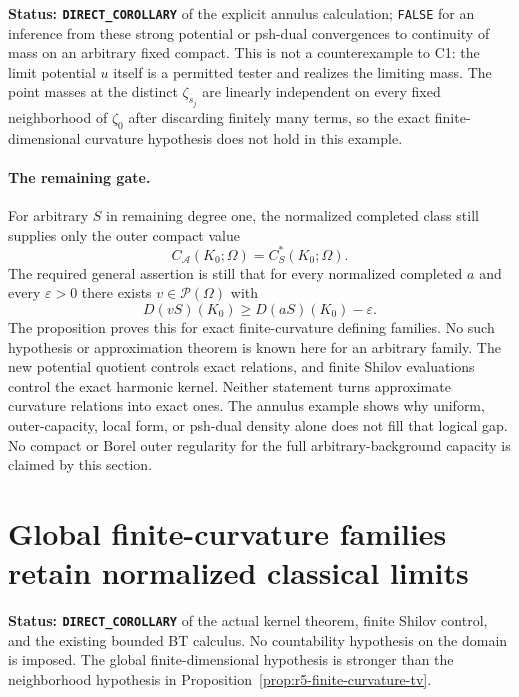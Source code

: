 \documentclass[11pt,a4paper]{article}
\numberwithin{equation}{section}
\theoremstyle{definition}
\theoremstyle{remark}
\begin{document}
\noindent\textbf{Status: \texttt{DIRECT\_COROLLARY}} of
the explicit annulus calculation; \texttt{FALSE} for an inference
from these strong potential or psh-dual convergences to
continuity of mass on an arbitrary fixed compact.
This is not a counterexample to C1: the limit potential $u$
itself is a permitted tester and realizes the limiting mass.
The point masses at the distinct $\zeta_{s_j}$ are linearly
independent on every fixed neighborhood of $\zeta_0$ after
discarding finitely many terms, so the exact finite-dimensional
curvature hypothesis does not hold in this example.

\paragraph{The remaining gate.}
For arbitrary $S$ in remaining degree one, the normalized
completed class still supplies only the outer compact value
\[
 C_{\mathcal A}(K_0;\Omega)=C_S^*(K_0;\Omega).
\]
The required general assertion is still that for every
normalized completed $a$ and every $\varepsilon>0$ there
exists $v\in\mathcal P(\Omega)$ with
\[
                 D(vS)(K_0)\ge D(aS)(K_0)-\varepsilon.
\]
The proposition proves this for exact finite-curvature defining
families.  No such hypothesis or approximation theorem is
known here for an arbitrary family.  The new potential quotient
controls exact relations, and finite Shilov evaluations control
the exact harmonic kernel.  Neither statement turns approximate
curvature relations into exact ones.  The annulus example shows
why uniform, outer-capacity, local form, or psh-dual density
alone does not fill that logical gap.  No compact or Borel
outer regularity for the full arbitrary-background capacity is
claimed by this section.



\section{Global finite-curvature families retain normalized classical limits}
\label{sec:r5-global-finite-curvature-compactness}

\noindent\textbf{Status: \texttt{DIRECT\_COROLLARY}} of
the actual kernel theorem, finite Shilov control, and the
existing bounded BT calculus.  No countability hypothesis on
the domain is imposed.  The global finite-dimensional
hypothesis is stronger than the neighborhood hypothesis in
Proposition~\ref{prop:r5-finite-curvature-tv}.
\end{document}
